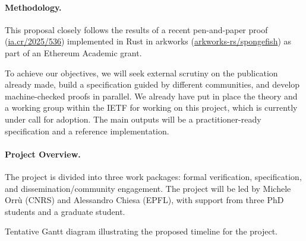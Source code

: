 \documentclass{article}
\begin{document}
\paragraph{Methodology.}
This proposal closely follows the results of a recent pen-and-paper proof (\href{https://eprint.iacr.org/2025/536.pdf}{ia.cr/2025/536}) implemented in Rust in arkworks (\href{https://github.com/arkworks-rs/spongefish}{arkworks-rs/spongefish}) as part of an Ethereum Academic grant.

To achieve our objectives, we will seek external scrutiny on the publication already made, build a specification guided by different communities, and develop machine-checked proofs in parallel. We already have put in place the theory and a working group within the IETF for working on this project, which is currently under call for adoption. The main outputs will be a practitioner-ready specification and a reference implementation.


\paragraph{Project Overview.}
The project is divided into three work packages: formal verification, specification, and dissemination/community engagement. The project will be led by Michele Orrù (CNRS) and Alessandro Chiesa (EPFL), with support from three PhD students and a graduate student.



\begin{table}[t]
    \def\arraystretch{1.2}%
\centering
\caption{Tentative Gantt diagram illustrating the proposed timeline for the project.}
\end{table}
\end{document}
